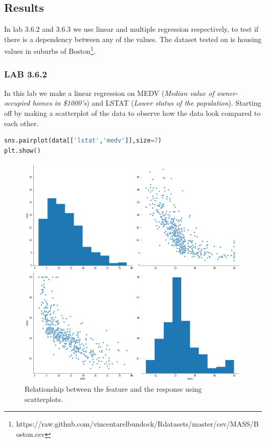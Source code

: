 \subsection{Results}
In lab 3.6.2 and 3.6.3 we use linear and multiple regression respectively, to test if there is a dependency between any of the values. The dataset tested on is housing values in suburbs of Boston\footnote{https://raw.github.com/vincentarelbundock/Rdatasets/master/csv/MASS/Boston.csv}.

\subsubsection*{LAB 3.6.2}
In this lab we make a linear regression on MEDV (\textit{Median value of owner-occupied homes in \$1000's}) and LSTAT (\textit{Lower status of the population}). Starting off by making a scatterplot of the data to observe how the data look compared to each other.

\begin{lstlisting}[language=Python]
sns.pairplot(data[['lstat','medv']],size=7)
plt.show()
\end{lstlisting}

\begin{figure}[h]
	\centering
	\includegraphics[scale=0.4, trim=0 0 0 500, clip=true]{regression/multipleLinearRegression/fig/bostonPairplotMdevLstat.png}
	\caption{Relationship between the feature and the response using scatterplots.}
	\label{fig:bostonPairplotMdevLstat}
\end{figure}

